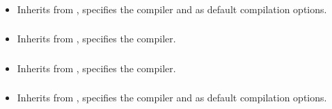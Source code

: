 \subsubsection*{}\label{subsec:CompileNasm}

\begin{itemize}[label={}]
    \item Inherits from \hyperref[subsec:CompileBase]{}, specifies the  compiler and
           as default compilation options.
\end{itemize}

\subsubsection*{}\label{subsec:CompileC}

\begin{itemize}[label={}]
    \item Inherits from \hyperref[subsec:CompileBase]{}, specifies the  compiler.
\end{itemize}

\subsubsection*{}\label{subsec:CompileCpp}

\begin{itemize}[label={}]
    \item Inherits from \hyperref[subsec:CompileBase]{}, specifies the  compiler.
\end{itemize}

\subsubsection*{}\label{subsec:CompileCSharp}

\begin{itemize}[label={}]
    \item Inherits from \hyperref[subsec:CompileBase]{}, specifies the  compiler and
           as default compilation options.
\end{itemize}

\subsubsection*{}\label{subsec:CompileGo}

